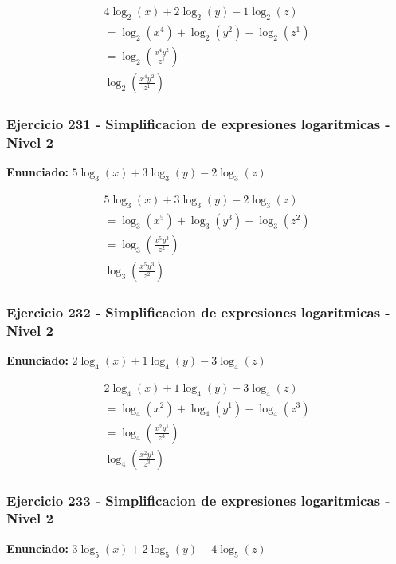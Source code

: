 \documentclass[12pt,a4paper]{article}
\begin{document}
\[
\begin{aligned}
4\log_{2}\left(x\right)+2\log_{2}\left(y\right)-1\log_{2}\left(z\right)\\
=\log_{2}\left(x^{4}\right)+\log_{2}\left(y^{2}\right)-\log_{2}\left(z^{1}\right)\\
=\log_{2}\left(\frac{x^{4}y^{2}}{z^{1}}\right)\\
\boxed{\log_{2}\left(\frac{x^{4}y^{2}}{z^{1}}\right)}
\end{aligned}
\]


\subsubsection*{Ejercicio 231 - Simplificacion de expresiones logaritmicas - Nivel 2}
\textbf{Enunciado:} \(5\log_{3}\left(x\right)+3\log_{3}\left(y\right)-2\log_{3}\left(z\right)\)

\[
\begin{aligned}
5\log_{3}\left(x\right)+3\log_{3}\left(y\right)-2\log_{3}\left(z\right)\\
=\log_{3}\left(x^{5}\right)+\log_{3}\left(y^{3}\right)-\log_{3}\left(z^{2}\right)\\
=\log_{3}\left(\frac{x^{5}y^{3}}{z^{2}}\right)\\
\boxed{\log_{3}\left(\frac{x^{5}y^{3}}{z^{2}}\right)}
\end{aligned}
\]


\subsubsection*{Ejercicio 232 - Simplificacion de expresiones logaritmicas - Nivel 2}
\textbf{Enunciado:} \(2\log_{4}\left(x\right)+1\log_{4}\left(y\right)-3\log_{4}\left(z\right)\)

\[
\begin{aligned}
2\log_{4}\left(x\right)+1\log_{4}\left(y\right)-3\log_{4}\left(z\right)\\
=\log_{4}\left(x^{2}\right)+\log_{4}\left(y^{1}\right)-\log_{4}\left(z^{3}\right)\\
=\log_{4}\left(\frac{x^{2}y^{1}}{z^{3}}\right)\\
\boxed{\log_{4}\left(\frac{x^{2}y^{1}}{z^{3}}\right)}
\end{aligned}
\]


\subsubsection*{Ejercicio 233 - Simplificacion de expresiones logaritmicas - Nivel 2}
\textbf{Enunciado:} \(3\log_{5}\left(x\right)+2\log_{5}\left(y\right)-4\log_{5}\left(z\right)\)
\end{document}
